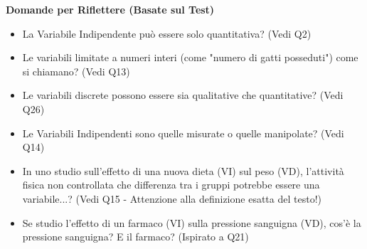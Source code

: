 \documentclass[12pt, a4paper]{article}
\newenvironment{reflectionbox}{%
    \begin{framed}\par\medskip\noindent
    \textbf{\color{boxtitlecolor}Domande per Riflettere (Basate sul Test)} \par
    \begin{itemize}[leftmargin=*, label=$\blacktriangleright$]
}{%
    \end{itemize}\par\medskip
    \end{framed}
}
\begin{document}
\begin{reflectionbox}
    \item La Variabile Indipendente può essere solo quantitativa? (Vedi Q2)
    \item Le variabili limitate a numeri interi (come "numero di gatti posseduti") come si chiamano? (Vedi Q13)
    \item Le variabili discrete possono essere sia qualitative che quantitative? (Vedi Q26)
    \item Le Variabili Indipendenti sono quelle misurate o quelle manipolate? (Vedi Q14)
    \item In uno studio sull'effetto di una nuova dieta (VI) sul peso (VD), l'attività fisica non controllata che differenza tra i gruppi potrebbe essere una variabile...? (Vedi Q15 - Attenzione alla definizione esatta del testo!)
    \item Se studio l'effetto di un farmaco (VI) sulla pressione sanguigna (VD), cos'è la pressione sanguigna? E il farmaco? (Ispirato a Q21)
\end{reflectionbox}
\end{document}

